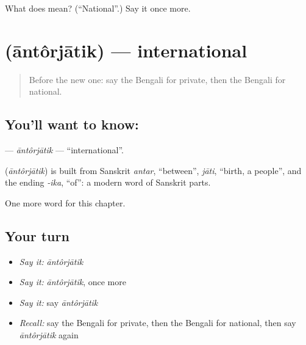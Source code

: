 \begin{tcolorbox}[breakable,colback=teal!4,colframe=teal!35!black,title={Before you move on}]
What does  mean? (\textquotedblleft{}National\textquotedblright{}.) Say it once more.
\end{tcolorbox}
\section[\texorpdfstring{\bn{আন্তর্জাতিক} (āntôrjātik)}{আন্তর্জাতিক (āntôrjātik)}]{ (āntôrjātik) — international}

\label{lesson:BN-C221-antorjatik}



\begin{quote}
Before the new one: say the Bengali for private, then the Bengali for national.
\end{quote}

\subsection*{You'll want to know: }
\textbf{} — \emph{āntôrjātik} — \textquotedblleft{}international\textquotedblright{}.

\begin{cousinweb}
\textbf{} (\emph{āntôrjātik}) is built from Sanskrit \emph{antar}, \textquotedblleft{}between\textquotedblright{}, \emph{jāti}, \textquotedblleft{}birth, a people\textquotedblright{}, and the ending \emph{-ika}, \textquotedblleft{}of\textquotedblright{}: a modern word of Sanskrit parts.
\end{cousinweb}

\begin{grammarlens}[title={What you've built}]
One more word for this chapter.
\end{grammarlens}

\subsection*{Your turn}
\begin{itemize}
\raggedright
  \item \emph{Say it:} \emph{āntôrjātik}
  \item \emph{Say it:} \emph{āntôrjātik}, once more
  \item \emph{Say it:} say \emph{āntôrjātik}
  \item \emph{Recall:} say the Bengali for private, then the Bengali for national, then say \emph{āntôrjātik} again
\end{itemize}

